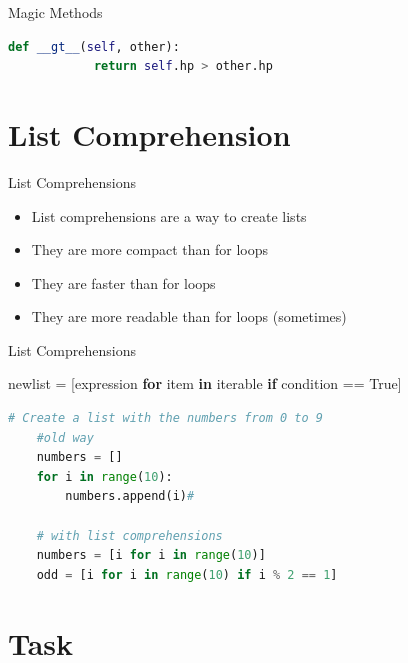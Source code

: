 \documentclass{beamer}
\begin{document}
\begin{frame}[fragile]{Magic Methods}
    \begin{lstlisting}[language=Python]
        def __gt__(self, other):
            return self.hp > other.hp
    \end{lstlisting}
        
    \end{frame}


\section{List Comprehension}

\begin{frame}{List Comprehensions}
    \begin{itemize}
        \item List comprehensions are a way to create lists
        \item They are more compact than for loops
        \item They are faster than for loops
        \item They are more readable than for loops (sometimes)
    \end{itemize}
\end{frame}

\begin{frame}[fragile]{List Comprehensions}

    newlist = [expression \textbf{for} item \textbf{in} iterable \textbf{if} condition == True]
    \begin{lstlisting}[language=Python]
    # Create a list with the numbers from 0 to 9
    #old way
    numbers = []
    for i in range(10):
        numbers.append(i)#

    # with list comprehensions
    numbers = [i for i in range(10)]
    odd = [i for i in range(10) if i % 2 == 1]
    \end{lstlisting}
\end{frame}

\section{Task}
\end{document}
